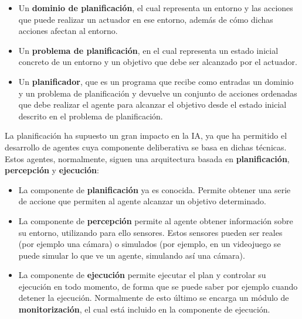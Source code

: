 \begin{itemize}[label=\textbullet]
    \item Un \textbf{dominio de planificación}, el cual representa un entorno y las acciones
    que puede realizar un actuador en ese entorno, además de cómo dichas acciones afectan
    al entorno.
    \item Un \textbf{problema de planificación}, en el cual representa un estado inicial
    concreto de un entorno y un objetivo que debe ser alcanzado por el actuador.
    \item Un \textbf{planificador}, que es un programa que recibe como entradas un dominio y un
    problema de planificación y devuelve un conjunto de acciones ordenadas que debe realizar
    el agente para alcanzar el objetivo desde el estado inicial descrito en el problema de
    planificación.
\end{itemize}

La planificación ha supuesto un gran impacto en la IA, ya que ha permitido el desarrollo
de agentes cuya componente deliberativa se basa en dichas técnicas. Estos agentes, normalmente,
siguen una arquitectura basada en \textbf{planificación}, \textbf{percepción} y \textbf{ejecución}:

\begin{itemize}
    \item La componente de \textbf{planificación} ya es conocida. Permite obtener una serie
    de accione que permiten al agente alcanzar un objetivo determinado.
    \item La componente de \textbf{percepción} permite al agente obtener información sobre
    su entorno, utilizando para ello sensores. Estos sensores pueden ser reales (por ejemplo
    una cámara) o simulados (por ejemplo, en un videojuego se puede simular lo que
    ve un agente, simulando así una cámara).
    \item La componente de \textbf{ejecución} permite ejecutar el plan y controlar su ejecución
    en todo momento, de forma que se puede saber por ejemplo cuando detener la ejecución. Normalmente
    de esto último se encarga un módulo de \textbf{monitorización}, el cual está incluido en la componente
    de ejecución.
\end{itemize}

